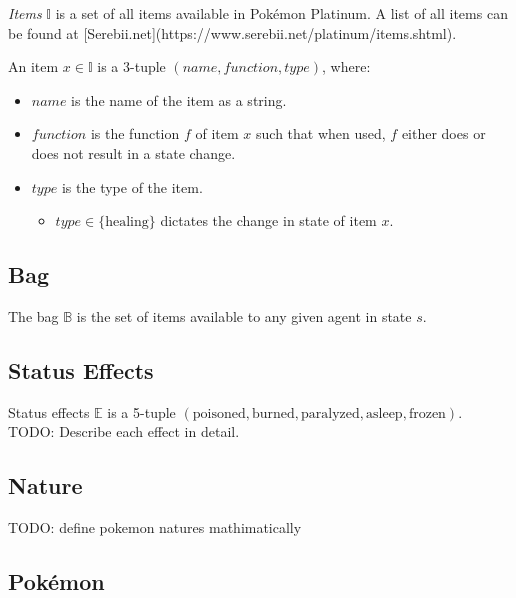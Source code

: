 \emph{Items} $\mathbb{I}$ is a set of all items available in Pokémon Platinum. A list of all items can be found at [Serebii.net](https://www.serebii.net/platinum/items.shtml).

An item $x \in \mathbb{I}$ is a 3-tuple $(name, function, type)$, where:
\begin{itemize}
    \item $name$ is the name of the item as a string.
    \item $function$ is the function $f$ of item $x$ such that when used, $f$ either does or does not result in a state change.
    \item $type$ is the type of the item.
    \begin{itemize}
        \item $type \in \{ \text{healing} \}$ dictates the change in state of item $x$.
    \end{itemize}
\end{itemize}

\subsection{Bag}

The bag $\mathbb{B}$ is the set of items available to any given agent in state $s$.

\subsection{Status Effects}

Status effects $\mathbb{E}$ is a 5-tuple $( \text{poisoned}, \text{burned}, \text{paralyzed}, \text{asleep}, \text{frozen} )$.
TODO: Describe each effect in detail.

\subsection{Nature}

TODO: define pokemon natures mathimatically

\subsection{Pokémon}

